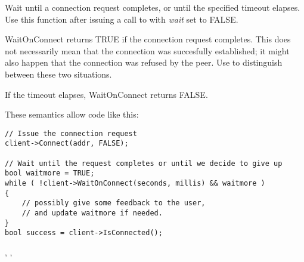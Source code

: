 %
%
\label{wxsocketclientwaitonconnect}


Wait until a connection request completes, or until the specified timeout
elapses. Use this function after issuing a call to 
with {\it wait} set to FALSE.





WaitOnConnect returns TRUE if the connection request completes. This
does not necessarily mean that the connection was succesfully established;
it might also happen that the connection was refused by the peer. Use 
 to distinguish between
these two situations.

If the timeout elapses, WaitOnConnect returns FALSE.

These semantics allow code like this:

\begin{verbatim}
// Issue the connection request
client->Connect(addr, FALSE);

// Wait until the request completes or until we decide to give up
bool waitmore = TRUE; 
while ( !client->WaitOnConnect(seconds, millis) && waitmore )
{
    // possibly give some feedback to the user,
    // and update waitmore if needed.
}
bool success = client->IsConnected();
\end{verbatim}


, 
, 

\section{}\label{wxsocketevent}

